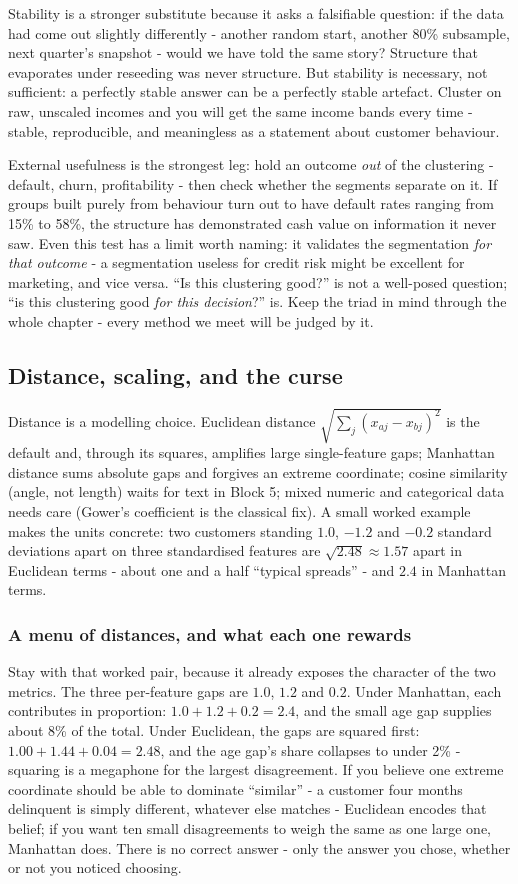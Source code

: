 \documentclass[11pt,a4paper]{article}
\begin{document}
Stability is a stronger substitute because it asks a falsifiable
question: if the data had come out slightly differently - another
random start, another 80\% subsample, next quarter's snapshot - would
we have told the same story? Structure that evaporates under reseeding
was never structure. But stability is necessary, not sufficient: a
perfectly stable answer can be a perfectly stable artefact. Cluster on
raw, unscaled incomes and you will get the same income bands every time
- stable, reproducible, and meaningless as a statement about customer
behaviour.

External usefulness is the strongest leg: hold an outcome \emph{out} of
the clustering - default, churn, profitability - then check whether
the segments separate on it. If groups built purely from behaviour turn
out to have default rates ranging from 15\% to 58\%, the structure has
demonstrated cash value on information it never saw. Even this test has
a limit worth naming: it validates the segmentation \emph{for that
outcome} - a segmentation useless for credit risk might be excellent
for marketing, and vice versa. ``Is this clustering good?'' is not a
well-posed question; ``is this clustering good \emph{for this
decision}?'' is. Keep the triad in mind through the whole chapter -
every method we meet will be judged by it.

\subsection{Distance, scaling, and the curse}
Distance is a modelling choice. Euclidean distance
$\sqrt{\sum_j (x_{aj}-x_{bj})^2}$ is the default and, through its squares,
amplifies large single-feature gaps; Manhattan distance sums absolute
gaps and forgives an extreme coordinate; cosine similarity (angle, not
length) waits for text in Block 5; mixed numeric and categorical data
needs care (Gower's coefficient is the classical fix). A small worked
example makes the units concrete: two customers standing $1.0$, $-1.2$
and $-0.2$ standard deviations apart on three standardised features are
$\sqrt{2.48} \approx 1.57$ apart in Euclidean terms - about one and a
half ``typical spreads'' - and $2.4$ in Manhattan terms.

\subsubsection{A menu of distances, and what each one rewards}
Stay with that worked pair, because it already exposes the character of
the two metrics. The three per-feature gaps are $1.0$, $1.2$ and $0.2$.
Under Manhattan, each contributes in proportion:
$1.0 + 1.2 + 0.2 = 2.4$, and the small age gap supplies about 8\% of
the total. Under Euclidean, the gaps are squared first:
$1.00 + 1.44 + 0.04 = 2.48$, and the age gap's share collapses to under
2\% - squaring is a megaphone for the largest disagreement. If you
believe one extreme coordinate should be able to dominate ``similar''
- a customer four months delinquent is simply different, whatever else
matches - Euclidean encodes that belief; if you want ten small
disagreements to weigh the same as one large one, Manhattan does. There
is no correct answer - only the answer you chose, whether or not you
noticed choosing.
\end{document}
